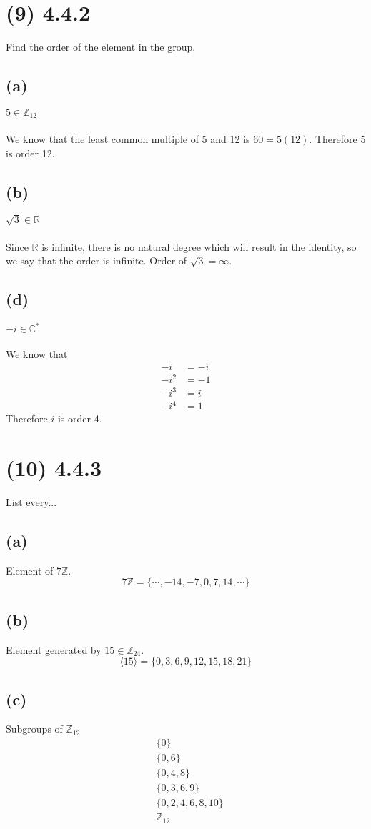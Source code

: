 \documentclass{article}
\begin{document}
\section*{(9) 4.4.2}
Find the order of the element in the group.
\subsection*{(a)}
$5 \in \mathbb{Z}_{12}$
\\\\
We know that the least common multiple of 5 and 12 is $60 = 5(12)$.
Therefore 5 is order 12.
\subsection*{(b)}
$\sqrt{3} \in \mathbb{R}$
\\\\
Since $\mathbb{R}$ is infinite, there is no natural degree which will result in the identity, so we say that the order is infinite.
Order of $\sqrt{3} = \infty$.
\subsection*{(d)}
$-i \in \mathbb{C}^*$
\\\\
We know that
\begin{align*}
    -i & = -i \\
    -i^2 & = -1 \\
    -i^3 & = i \\
    -i^4 & = 1
\end{align*}
Therefore $i$ is order 4.
\section*{(10) 4.4.3}
List every...
\subsection*{(a)}
Element of $7\mathbb{Z}$.
\[ 7\mathbb{Z} = \{ \cdots, -14, -7, 0, 7, 14, \cdots\} \]
\subsection*{(b)}
Element generated by $15 \in \mathbb{Z}_{24}$.
\[\langle 15 \rangle= \{0,3,6,9,12,15,18,21\}\]
\subsection*{(c)}
Subgroups of $\mathbb{Z}_{12}$
\begin{align*}
    & \{0\} \\
    & \{0,6\} \\
    & \{0,4,8\} \\
    & \{0,3,6,9\} \\
    & \{0,2,4,6,8,10\} \\
    & \mathbb{Z}_{12}
\end{align*}
\end{document}

